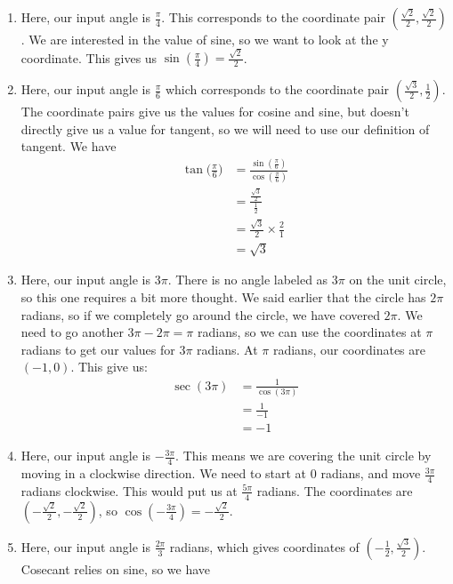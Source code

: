{\begin{enumerate}
	\item Here, our input angle is $\frac{\pi}{4}$. This corresponds to the coordinate pair $(\frac{\sqrt{2}}{2}, \frac{\sqrt{2}}{2})$. We are interested in the value of sine, so we want to look at the y coordinate. This gives us $\sin{(\frac{\pi}{4})}=\frac{\sqrt{2}}{2}$.
	\item Here, our input angle is $\frac{\pi}{6}$ which corresponds to the coordinate pair $(\frac{\sqrt{3}}{2}, \frac{1}{2})$. The coordinate pairs give us the values for cosine and sine, but doesn't directly give us a value for tangent, so we will need to use our definition of tangent. We have 
		\begin{equation*}
			\begin{split}
				\tan{\bigg(\frac{\pi}{6}\bigg)} &= \frac{\sin{(\frac{\pi}{6})}}{\cos{(\frac{\pi}{6})}} \\
						      &=\frac{\frac{\sqrt{3}}{2}}{\frac{1}{2}} \\
						      &= \frac{\sqrt{3}}{2} \times \frac{2}{1} \\
						      & = \sqrt{3}
			\end{split}
	\end{equation*}
	\item Here, our input angle is $3\pi$. There is no angle labeled as $3\pi$ on the unit circle, so this one requires a bit more thought. We said earlier that the circle has $2\pi$ radians, so if we completely go around the circle, we have covered $2\pi$. We need to go another $3\pi-2\pi=\pi$ radians, so we can use the coordinates at $\pi$ radians to get our values for $3\pi$ radians. At $\pi$ radians, our coordinates are $(-1,0)$. This give us:
		\begin{equation*}
			\begin{split}
				\sec{(3\pi)} & = \frac{1}{\cos{(3\pi)}} \\
					     & = \frac{1}{-1} \\
					     & = -1
			\end{split}
		\end{equation*}
	\item Here, our input angle is $-\frac{3\pi}{4}$. This means we are covering the unit circle by moving in a clockwise direction. We need to start at $0$ radians, and move $\frac{3\pi}{4}$ radians clockwise. This would put us at $\frac{5\pi}{4}$ radians. The coordinates are $(-\frac{\sqrt{2}}{2}, -\frac{\sqrt{2}}{2})$, so $\cos{(-\frac{3\pi}{4})} = -\frac{\sqrt{2}}{2}$.
	\item Here, our input angle is $\frac{2\pi}{3}$ radians, which gives coordinates of $(-\frac{1}{2}, \frac{\sqrt{3}}{2})$. Cosecant relies on sine, so we have

\end{enumerate}}
